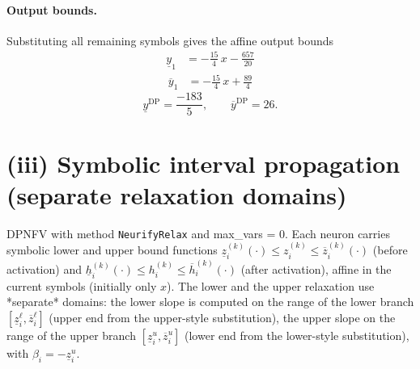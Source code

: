 \documentclass[11pt]{article}
\begin{document}
\paragraph{Output bounds.}
Substituting all remaining symbols gives the affine output bounds
\begin{align*}
\underline{y}_{1} &= -\frac{15}{4}\,x - \frac{657}{20}
\end{align*}
\begin{align*}
\overline{y}_{1} &= -\frac{15}{4}\,x + \frac{89}{4}
\end{align*}
\begin{equation*}
\underline{y}^{\text{DP}} = \frac{-183}{5}, \qquad \overline{y}^{\text{DP}} = 26.
\end{equation*}

\section{(iii) Symbolic interval propagation (separate relaxation domains)}
DPNFV with method \texttt{NeurifyRelax} and max\_vars = 0. Each neuron carries symbolic lower and upper bound functions
$\underline{z}^{(k)}_i(\cdot) \le z^{(k)}_i \le \overline{z}^{(k)}_i(\cdot)$ (before activation)
and $\underline{h}^{(k)}_i(\cdot) \le h^{(k)}_i \le \overline{h}^{(k)}_i(\cdot)$ (after activation),
affine in the current symbols (initially only $x$).
The lower and the upper relaxation use *separate* domains:
the lower slope is computed on the range of the lower branch
$[\underline{z}^{\ell}_i, \overline{z}^{\ell}_i]$ (upper end from the upper-style substitution),
the upper slope on the range of the upper branch
$[\underline{z}^{u}_i, \overline{z}^{u}_i]$ (lower end from the lower-style substitution),
with $\beta_i = -\underline{z}^{u}_i$.
\end{document}
